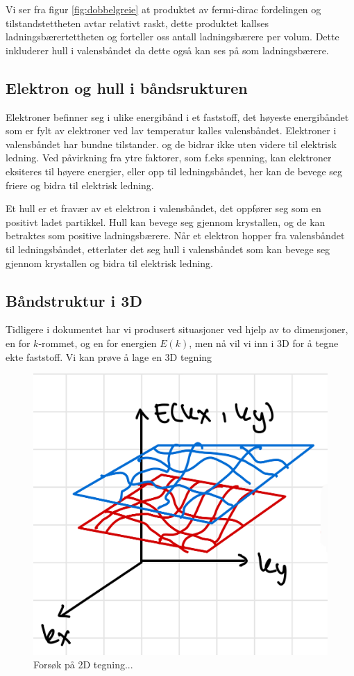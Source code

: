 Vi ser fra figur \ref{fig:dobbelgreie} at produktet av fermi-dirac fordelingen og tilstandstettheten avtar relativt raskt, dette produktet kallses ladningsbærertettheten og forteller oss antall ladningsbærere per volum. Dette inkluderer hull i valensbåndet da dette også kan ses på som ladningsbærere.

\newpage
\subsection{Elektron og hull i båndsrukturen}
\label{sec:tema6_4}
Elektroner befinner seg i ulike energibånd i et faststoff, det høyeste energibåndet som er fylt av elektroner ved lav temperatur kalles valensbåndet. Elektroner i valensbåndet har bundne tilstander. og de bidrar ikke uten videre til elektrisk ledning. Ved påvirkning fra ytre faktorer, som f.eks spenning, kan elektroner eksiteres til høyere energier, eller opp til ledningsbåndet, her kan de bevege seg friere og bidra til elektrisk ledning.

Et hull er et fravær av et elektron i valensbåndet, det oppfører seg som en positivt ladet partikkel. Hull kan bevege seg gjennom krystallen, og de kan betraktes som positive ladningsbærere. Når et elektron hopper fra valensbåndet til ledningsbåndet, etterlater det seg hull i valensbåndet som kan bevege seg gjennom krystallen og bidra til elektrisk ledning.

\subsection{Båndstruktur i 3D}
\label{sec:tema6_5}
Tidligere i dokumentet har vi produsert situasjoner ved hjelp av to dimensjoner, en for $k$-rommet, og en for energien $E(k)$, men nå vil vi inn i 3D for å tegne ekte faststoff. Vi kan prøve å lage en 3D tegning

\begin{figure}[!htb]
    \centering
    \includegraphics[scale=0.2]{Bilder/SamtaleTema6/2d-bandstruct.jpeg}
    \caption{Forsøk på 2D tegning...}
    \label{fig:2d_tegning}
\end{figure}

